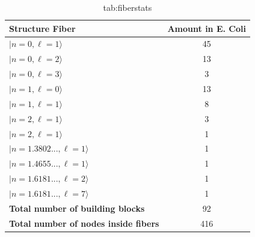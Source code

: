 \documentclass[12pt]{diazessay} %
\begin{document}
\begin{table}[H]
	\centering
	\begin{tabular}[b]{lc}\hline
		Structure Fiber & Amount in E. Coli  \\ \hline
		$| n = 0, \ell = 1 \rangle$ & 45 \\
		$| n = 0, \ell = 2 \rangle$ & 13 \\
		$| n = 0, \ell = 3 \rangle$ & 3 \\ 
		$| n = 1, \ell = 0 \rangle$ & 13 \\
		$| n = 1, \ell = 1 \rangle$ & 8 \\
		$| n = 2, \ell = 1 \rangle$ & 3 \\
		$| n = 2, \ell = 1 \rangle$ & 1 \\ 
		$| n = 1.3802..., \ell = 1 \rangle$ & 1 \\ 
		$| n = 1.4655..., \ell = 1 \rangle$ & 1 \\  
		$| n = 1.6181..., \ell = 2 \rangle$ & 1 \\ 
		$| n = 1.6181..., \ell = 7 \rangle$ & 1 \\ 
		\hline
		\textbf{Total number of building blocks} & 92 \\
		\hline
		\textbf{Total number of nodes inside fibers} & 416 \\
		\hline
	  \end{tabular}
	  \caption{tab:fiberstats}
	  \label{tab:fiberstats}
\end{table}
	







\end{document}
